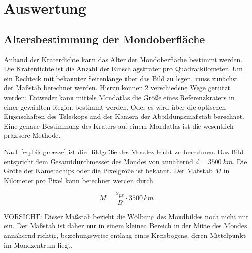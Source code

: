 \documentclass[10pt,a4paper,titlepage]{article}
\begin{document}
\section{Auswertung}
\subsection{Altersbestimmung der Mondoberfläche}

\noindent{}

Anhand der Kraterdichte kann das Alter der Mondoberfläche bestimmt werden. Die Kraterdichte ist die Anzahl der Einschlagskrater pro Quadratkilometer. Um ein Rechteck mit bekannter Seitenlänge über das Bild zu legen, muss zunächst der Maßstab berechnet werden. Hierzu können 2 verschiedene Wege genutzt werden: Entweder kann mittels Mondatlas die Größe eines Referenzkraters in einer gewählten Region bestimmt werden. Oder es wird über die optischen Eigenschaften des Teleskops und der Kamera der Abbildungsmaßstab berechnet. Eine genaue Bestimmung des Kraters auf einem Mondatlas ist die wesentlich präzisere Methode.

Nach \ref{eq:bildgroesse} ist die Bildgröße des Mondes leicht zu berechnen. Das Bild entspricht dem Gesamtdurchmesser des Mondes von annähernd $d = \SI{3500}{km}$. Die Größe der Kamerachips oder die Pixelgröße ist bekannt. Der Maßstab $M$ in Kilometer pro Pixel kann berechnet werden durch

\begin{equation}
M = \frac{s_{px}}{B} \cdot \SI{3500}{km}
\label{eq:masstab}
\end{equation}

VORSICHT: Dieser Maßstab bezieht die Wölbung des Mondbildes noch nicht mit ein. Der Maßstab ist daher nur in einem kleinen Bereich in der Mitte des Mondes annähernd richtig, beziehungsweise entlang eines Kreisbogens, deren Mittelpunkt im Mondzentrum liegt.
\end{document}
